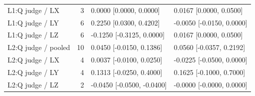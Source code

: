 \begin{longtable}{@{}p{1.8in}rl l@{}}
L1:Q judge / LX & 3 & 0.0000 [0.0000, 0.0000] & 0.0167 [0.0000, 0.0500]\\
L1:Q judge / LY & 6 & 0.2250 [0.0300, 0.4202] & -0.0050 [-0.0150, 0.0000]\\
L1:Q judge / LZ & 6 & -0.1250 [-0.3125, 0.0000] & 0.0167 [0.0000, 0.0500]\\
L2:Q judge / pooled & 10 & 0.0450 [-0.0150, 0.1386] & 0.0560 [-0.0357, 0.2192]\\
L2:Q judge / LX & 4 & 0.0037 [-0.0100, 0.0250] & -0.0225 [-0.0500, 0.0000]\\
L2:Q judge / LY & 4 & 0.1313 [-0.0250, 0.4000] & 0.1625 [-0.1000, 0.7000]\\
L2:Q judge / LZ & 2 & -0.0450 [-0.0500, -0.0400] & -0.0000 [-0.0000, 0.0000]\\
\end{longtable}\endgroup
\begingroup\footnotesize\setlength{\tabcolsep}{3pt}
